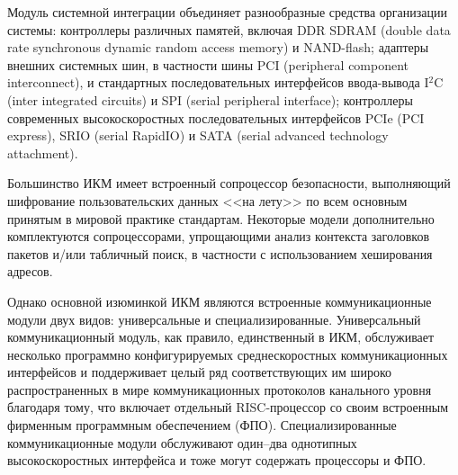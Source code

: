 \begin{multicols}{2}
     Модуль системной интеграции объединяет разнообразные средства организации 
системы: контроллеры различных памятей, включая DDR SDRAM (double data rate 
synchronous dynamic %
\mbox{random} access memory) и NAND-flash; адаптеры внешних системных 
шин, в частности шины PCI (peripheral component interconnect), и стандартных 
последовательных интерфейсов вво\-да-вы\-во\-да I$^2$C (inter integrated circuits) и SPI (serial 
peripheral interface); контроллеры современных высокоскоростных последовательных 
интерфейсов PCIe (PCI express), SRIO (serial RapidIO) и SATA (serial advanced technology 
attachment).
     
     Большинство ИКМ имеет встроенный сопроцессор безопасности, выполняющий 
шифрование пользовательских данных <<на лету>> по всем основным принятым в мировой 
практике стандартам. Некоторые модели дополнительно комплектуются сопроцессорами, 
упрощающими анализ контекста заголовков пакетов и/или табличный поиск, в частности с 
использованием хеширования адресов.
     
     Однако основной изюминкой ИКМ являются встроенные коммуникационные модули 
двух видов: универсальные и специализированные. Универсальный коммуникационный 
модуль, как %
прави\-ло, единственный в ИКМ, обслуживает несколь\-ко программно 
конфигурируемых среднескоростных коммуникационных интерфейсов и поддерживает 
целый ряд соответствующих им %
ши\-ро\-ко распространенных в мире коммуникационных 
протоколов канального уровня благодаря тому, что включает отдельный RISC-про\-цес\-сор со 
своим встроенным фирменным программным обеспечением (ФПО). Специализированные 
коммуникационные модули обслуживают один--два однотипных высокоскоростных 
интерфейса и тоже могут содержать процессоры и ФПО.
     

\end{multicols}
